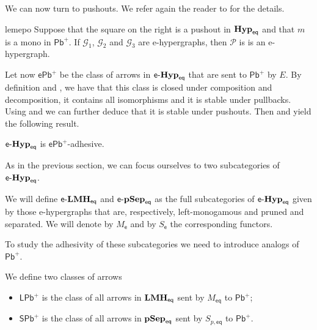 \documentclass[3p]{elsarticle}
\newcommand{\pbp}{\mathsf{Pb}^{+}}
\newcommand{\pbe}{\mathsf{ePb}^{+}}
\newcommand{\pblp}{\mathsf{LPb}^{+}}
\newcommand{\pbsp}{\mathsf{SPb}^{+}}
\newcommand{\eq}{\mathsf{eq}}
\newcommand{\catname}[1]{\textbf{\textup{#1}}}
\newcommand{\EqHyp}{\catname{Hyp}_{\mathsf{eq}}} %
\newcommand{\EqpsHyp}{\catname{pSep}_{\mathsf{eq}}}
\newcommand{\Eqlmo}{\catname{LMH}_{\mathsf{eq}}}
\newcommand{\egg}{\mathsf{e}\text{-}\catname{Hyp}_\eq}
\newcommand{\elm}{\mathsf{e}\text{-}\catname{LMH}_\eq}
\newcommand{\eps}{\mathsf{e}\text{-}\catname{pSep}_\eq}
\theoremstyle{remark}
\theoremstyle{definition}
\begin{document}
We can now turn to pushouts. We refer again the reader to  for the details.

\noindent
\begin{minipage}[l]{.83\linewidth}
	\begin{restatable}{lem}{epo}\label{lem:epo}
		Suppose that the square on the right is a pushout in $\EqHyp$ and that $m$ is a mono in $\pbp$. If $\mathcal{G}_1$, $\mathcal{G}_2$ and $\mathcal{G}_3$ are e-hypergraphs, then $\mathcal{P}$ is 
		is an e-hypergraph.
	\end{restatable}
\end{minipage}\hfill 
\begin{minipage}[r]{.15\linewidth}
\end{minipage}

Let now $\pbe$ be the class of arrows in $\egg$ that are sent to $\pbp$ by $E$. By definition and , we have that this class is closed under composition and decomposition, it contains all isomorphisms and it is stable under pullbacks. Using  and  we can further deduce that it is stable under pushouts. Then  and  yield the following result.

\begin{cor}\label{cor:pbe}
	$\egg$ is $\pbe$-adhesive.
\end{cor}

As in the previous section, we can focus ourselves to two subcategories of $\egg$.

\begin{defi}We will define $\elm$ and $\eps$ as the full subcategories of $\egg$ given by those e-hypergraphs that are, respectively, left-monogamous and pruned and separated. We will denote by $M_{\mathsf{e}}$ and by $S_{\mathsf{e}}$ the corresponding functors.
\end{defi}

To study the adhesivity of these subcategories we need to introduce analogs of $\pbp$.
\begin{defi}We define two classes of arrows
	\begin{itemize}
		\item $\pblp$ is the class of all arrows in $\Eqlmo$ sent by $M_{\eq}$ to $\pbp$;
		\item $\pbsp$ is the class of all arrows in $\EqpsHyp$ sent by $S_{p,\eq}$ to $\pbp$.
	\end{itemize}
\end{defi}
\end{document}
